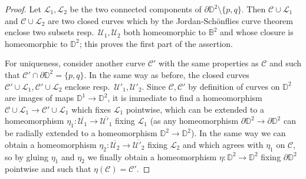 \documentclass[11pt,reqno]{amsart}
\theoremstyle{plain}
\theoremstyle{definition}
\theoremstyle{remark}
\numberwithin{equation}{subsection}
\newcommand*{\bbB}{\mathbb{B}}
\newcommand*{\bbD}{\mathbb{D}}
\newcommand*{\calC}{\mathcal{C}}
\newcommand*{\calL}{\mathcal{L}}
\newcommand*{\calU}{\mathcal{U}}
\begin{document}
\begin{proof}
    Let $\calL_1,\calL_2$ be the two connected components of $\partial\bbD^2\setminus\{p,q\}$. Then $\calC\cup\calL_1$ and $\calC\cup\calL_2$ are two closed curves which by the Jordan-Schönflies curve theorem \cite{thomassen1992jordan} enclose two subsets resp.\ $\calU_1,\calU_2$ both homeomorphic to $\bbB^2$ and whose closure is homeomorphic to $\bbD^2$; this proves the first part of the assertion.

    For uniqueness, consider another curve $\calC'$ with the same properties as $\calC$ and such that $\calC'\cap\partial\bbD^2=\{p,q\}$. In the same way as before, the closed curves $\calC'\cup\calL_1,\calC'\cup\calL_2$ enclose resp.\ $\calU'_1,\calU'_2$. Since $\calC,\calC'$ by definition of curves on $\bbD^2$ are images of maps $\bbD^1\to\bbD^2$, it is immediate to find a homeomorphism $\calC\cup\calL_1\to\calC'\cup\calL_1$ which fixes $\calL_1$ pointwise, which can be extended to a homeomorphism $\eta_1\colon\overline{\calU_1}\to\overline{\calU'_1}$ fixing $\calL_1$ (as any homeomorphism $\partial\bbD^2\to\partial\bbD^2$ can be radially extended to a homeomorphism $\bbD^2\to\bbD^2$). In the same way we can obtain a homeomorphism $\eta_2\colon\overline{\calU_2}\to\overline{\calU'_2}$ fixing $\calL_2$ and which agrees with $\eta_1$ on $\calC$, so by gluing $\eta_1$ and $\eta_2$ we finally obtain a homeomorphism $\eta\colon\bbD^2\to\bbD^2$ fixing $\partial\bbD^2$ pointwise and such that $\eta(\calC)=\calC'$.

\end{proof}
\end{document}

